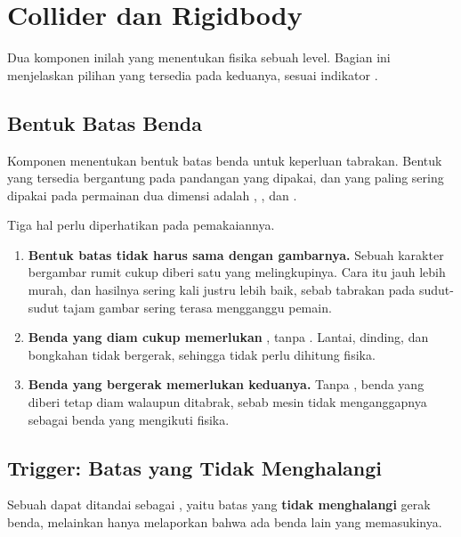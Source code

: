 \section{Collider dan Rigidbody}
\label{sec:collider-rigidbody}

Dua komponen inilah yang menentukan fisika sebuah level. Bagian ini menjelaskan
pilihan yang tersedia pada keduanya, sesuai indikator .

\subsection{Bentuk Batas Benda}

Komponen  menentukan bentuk batas benda untuk keperluan
tabrakan. Bentuk yang tersedia bergantung pada pandangan yang dipakai, dan
yang paling sering dipakai pada permainan dua dimensi adalah
, , dan
.

Tiga hal perlu diperhatikan pada pemakaiannya.

\begin{enumerate}
  \item \textbf{Bentuk batas tidak harus sama dengan gambarnya.} Sebuah
        karakter bergambar rumit cukup diberi satu 
        yang melingkupinya. Cara itu jauh lebih murah, dan hasilnya sering kali
        justru lebih baik, sebab tabrakan pada sudut-sudut tajam gambar sering
        terasa mengganggu pemain.
  \item \textbf{Benda yang diam cukup memerlukan }, tanpa
        . Lantai, dinding, dan bongkahan tidak bergerak,
        sehingga tidak perlu dihitung fisika.
  \item \textbf{Benda yang bergerak memerlukan keduanya.} Tanpa
        , benda yang diberi  tetap diam
        walaupun ditabrak, sebab mesin tidak menganggapnya sebagai benda yang
        mengikuti fisika.
\end{enumerate}

\subsection{Trigger: Batas yang Tidak Menghalangi}

Sebuah  dapat ditandai sebagai , yaitu
batas yang \textbf{tidak menghalangi} gerak benda, melainkan hanya melaporkan
bahwa ada benda lain yang memasukinya.

